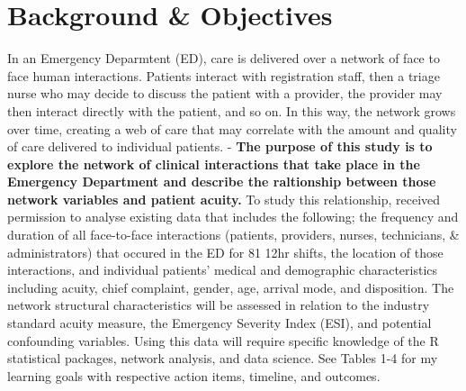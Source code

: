 \documentclass[]{elsarticle} %
\begin{document}
\section{Background \& Objectives}\label{background-objectives}

In an Emergency Deparmtent (ED), care is delivered over a network of
face to face human interactions. Patients interact with registration
staff, then a triage nurse who may decide to discuss the patient with a
provider, the provider may then interact directly with the patient, and
so on. In this way, the network grows over time, creating a web of care
that may correlate with the amount and quality of care delivered to
individual patients. - \textbf{The purpose of this study is to explore
the network of clinical interactions that take place in the Emergency
Department and describe the raltionship between those network variables
and patient acuity.} To study this relationship, received permission to
analyse existing data that includes the following; the frequency and
duration of all face-to-face interactions (patients, providers, nurses,
technicians, \& administrators) that occured in the ED for 81 12hr
shifts, the location of those interactions, and individual patients'
medical and demographic characteristics including acuity, chief
complaint, gender, age, arrival mode, and disposition. The network
structural characteristics will be assessed in relation to the industry
standard acuity measure, the Emergency Severity Index (ESI), and
potential confounding variables. Using this data will require specific
knowledge of the R statistical packages, network analysis, and data
science. See Tables 1-4 for my learning goals with respective action
items, timeline, and outcomes.
\end{document}
